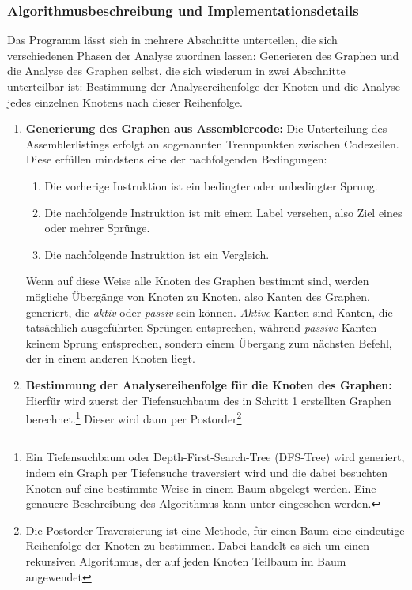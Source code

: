 \documentclass[11pt]{article}
\begin{document}
\subsubsection{Algorithmusbeschreibung und Implementationsdetails} Das Programm lässt sich in
mehrere Abschnitte unterteilen, die sich verschiedenen Phasen der Analyse zuordnen lassen:
Generieren des Graphen und die Analyse des Graphen selbst, die sich wiederum in zwei Abschnitte
unterteilbar ist: Bestimmung der Analysereihenfolge der Knoten und die Analyse jedes einzelnen
Knotens nach dieser Reihenfolge.
\begin{enumerate}
	\item{\textbf{Generierung des Graphen aus Assemblercode:}}
		Die Unterteilung des Assemblerlistings erfolgt an sogenannten Trennpunkten
		zwischen Codezeilen.
		Diese erfüllen mindstens eine der nachfolgenden Bedingungen:
		\begin{enumerate}
			\item{Die vorherige Instruktion ist ein bedingter oder unbedingter Sprung.}
			\item{Die nachfolgende Instruktion ist mit einem Label versehen,
				also Ziel eines oder mehrer Sprünge.}
			\item{Die nachfolgende Instruktion ist ein Vergleich.}
		\end{enumerate}
		Wenn auf diese Weise alle Knoten des Graphen bestimmt sind, werden mögliche Übergänge von
		Knoten zu Knoten, also Kanten des Graphen, generiert, die \textit{aktiv} oder
		\textit{passiv} sein können. \textit{Aktive} Kanten sind Kanten, die
		tatsächlich ausgeführten Sprüngen entsprechen, während \textit{passive}
		Kanten keinem Sprung entsprechen, sondern einem Übergang zum nächsten Befehl,
		der in einem anderen Knoten liegt.
	\item{\textbf{Bestimmung der Analysereihenfolge für die Knoten des Graphen:}} Hierfür wird
		zuerst der Tiefensuchbaum des in Schritt 1 erstellten Graphen berechnet.\footnote{
			Ein Tiefensuchbaum oder Depth-First-Search-Tree (DFS-Tree) wird generiert,
			indem ein Graph per Tiefensuche traversiert wird und die dabei besuchten
			Knoten auf eine bestimmte Weise in einem  Baum abgelegt werden. Eine genauere
			Beschreibung des Algorithmus kann unter \cite{wiki2:5} eingesehen werden.
		}
		Dieser wird dann per Postorder\footnote{
			Die Postorder-Traversierung ist eine Methode, für einen Baum eine eindeutige
			Reihenfolge der Knoten zu bestimmen. Dabei handelt es sich um einen
			rekursiven Algorithmus, der auf jeden Knoten Teilbaum im Baum angewendet
}
\end{enumerate}
\end{document}
